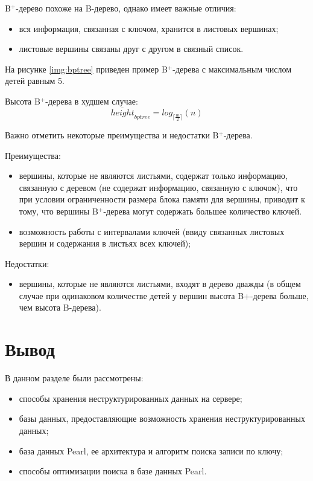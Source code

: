 B$^+$-дерево похоже на B-дерево, однако имеет важные отличия:
\begin{itemize}
    \item вся информация, связанная с ключом, хранится в листовых вершинах;
    \item листовые вершины связаны друг с другом в связный список.
\end{itemize}

На рисунке \ref{img:bptree} приведен пример B$^+$-дерева с максимальным числом детей равным 5.


Высота B$^+$-дерева в худшем случае\cite{hbptree}:
\begin{equation}
    \overline{height}_{bptree} = log_{\lceil\frac{m}{2}\rceil}(n)
\end{equation}

Важно отметить некоторые преимущества и недостатки B$^+$-дерева.

Преимущества:
\begin{itemize}
    \item вершины, которые не являются листьями, содержат только информацию, связанную с деревом (не содержат информацию, связанную с ключом), что при условии ограниченности размера блока памяти для вершины, приводит к тому, что вершины B$^+$-дерева могут содержать большее количество ключей.
    \item возможность работы с интервалами ключей (ввиду связанных листовых вершин и содержания в листьях всех ключей);
\end{itemize}

Недостатки:
\begin{itemize}
    \item вершины, которые не являются листьями, входят в дерево дважды (в общем случае при одинаковом количестве детей у вершин высота B+-дерева больше, чем высота B-дерева).
\end{itemize}

\section*{Вывод}

В данном разделе были рассмотрены:
\begin{itemize}
    \item способы хранения неструктурированных данных на сервере;
    \item базы данных, предоставляющие возможность хранения неструктурированных данных;
    \item база данных Pearl, ее архитектура и алгоритм поиска записи по ключу;
    \item способы оптимизации поиска в базе данных Pearl.
\end{itemize}

